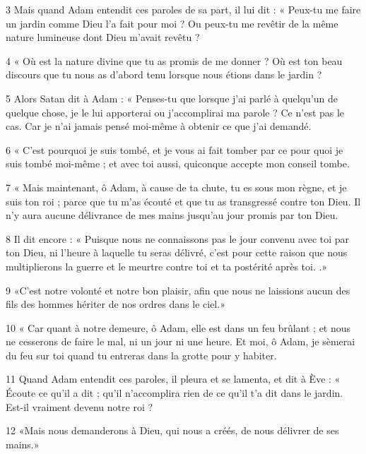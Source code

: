\par 3 Mais quand Adam entendit ces paroles de sa part, il lui dit : « Peux-tu me faire un jardin comme Dieu l'a fait pour moi ? Ou peux-tu me revêtir de la même nature lumineuse dont Dieu m’avait revêtu ?

\par 4 « Où est la nature divine que tu as promis de me donner ? Où est ton beau discours que tu nous as d’abord tenu lorsque nous étions dans le jardin ?

\par 5 Alors Satan dit à Adam : « Penses-tu que lorsque j'ai parlé à quelqu'un de quelque chose, je le lui apporterai ou j'accomplirai ma parole ? Ce n’est pas le cas. Car je n’ai jamais pensé moi-même à obtenir ce que j’ai demandé.

\par 6 « C'est pourquoi je suis tombé, et je vous ai fait tomber par ce pour quoi je suis tombé moi-même ; et avec toi aussi, quiconque accepte mon conseil tombe.

\par 7 « Mais maintenant, ô Adam, à cause de ta chute, tu es sous mon règne, et je suis ton roi ; parce que tu m'as écouté et que tu as transgressé contre ton Dieu. Il n'y aura aucune délivrance de mes mains jusqu'au jour promis par ton Dieu.

\par 8 Il dit encore : « Puisque nous ne connaissons pas le jour convenu avec toi par ton Dieu, ni l'heure à laquelle tu seras délivré, c'est pour cette raison que nous multiplierons la guerre et le meurtre contre toi et ta postérité après toi. .»

\par 9 «C'est notre volonté et notre bon plaisir, afin que nous ne laissions aucun des fils des hommes hériter de nos ordres dans le ciel.»

\par 10 « Car quant à notre demeure, ô Adam, elle est dans un feu brûlant ; et nous ne cesserons de faire le mal, ni un jour ni une heure. Et moi, ô Adam, je sèmerai du feu sur toi quand tu entreras dans la grotte pour y habiter.

\par 11 Quand Adam entendit ces paroles, il pleura et se lamenta, et dit à Ève : « Écoute ce qu'il a dit ; qu'il n'accomplira rien de ce qu'il t'a dit dans le jardin. Est-il vraiment devenu notre roi ?

\par 12 «Mais nous demanderons à Dieu, qui nous a créés, de nous délivrer de ses mains.»

